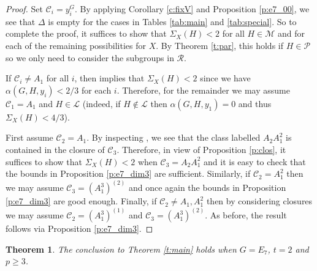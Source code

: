 \documentclass[twoside,a4paper,reqno,11pt]{amsart}
\renewcommand{\a}{\alpha}
\newcommand{\<}{\langle}
\renewcommand{\>}{\rangle}
\newcommand{\geqs}{\geqslant}
\renewcommand{\:}{\colon}
\theoremstyle{plain}
\newtheorem{thm}{Theorem}[section]
\theoremstyle{definition}
\begin{document}
\begin{proof}
Set $\mathcal{C}_i = y_i^G$. By applying Corollary \ref{c:fixV} and Proposition \ref{p:e7_00}, we see that $\Delta$ is empty for the cases in Tables \ref{tab:main} and \ref{tab:special}. So to complete the proof, it suffices to show that $\Sigma_X(H)<2$ for all $H \in \mathcal{M}$ and for each of the remaining possibilities for $X$. By Theorem \ref{t:par}, this holds if $H \in \mathcal{P}$ so we only need to consider the subgroups in $\mathcal{R}$. 

If $\mathcal{C}_i \ne A_1$ for all $i$, then \cite[Theorem 3.1]{BGG1} implies that $\Sigma_X(H) <2$ since we have $\a(G,H,y_i)<2/3$ for each $i$. Therefore, for the remainder we may assume $\mathcal{C}_1 = A_1$ and $H \in \mathcal{L}$ (indeed, if $H \not\in \mathcal{L}$ then $\a(G,H,y_1) = 0$ and thus $\Sigma_X(H) < 4/3$). 

First assume $\mathcal{C}_2 = A_1$. By inspecting \cite[Chapter 4]{Spal}, we see that the class labelled $A_2A_1^2$ is contained in the closure of $\mathcal{C}_3$. Therefore, in view of Proposition \ref{p:clos}, it suffices to show that $\Sigma_X(H)<2$ when $\mathcal{C}_3 = A_2A_1^2$ and it is easy to check that the bounds in Proposition \ref{p:e7_dim3} are sufficient. Similarly, if $\mathcal{C}_2 = A_1^2$ then we may assume $\mathcal{C}_3 = (A_1^3)^{(2)}$ and once again the bounds in Proposition \ref{p:e7_dim3} are good enough. Finally, if $\mathcal{C}_2 \ne A_1,A_1^2$ then by considering closures we may assume $\mathcal{C}_2 = (A_1^3)^{(1)}$ and $\mathcal{C}_3 = (A_1^3)^{(2)}$. As before, the result follows via Proposition \ref{p:e7_dim3}.
\end{proof}

\begin{thm}\label{t:e7_2}
The conclusion to Theorem \ref{t:main} holds when $G = E_7$, $t=2$ and $p \geqs 3$.
\end{thm}
\end{document}
